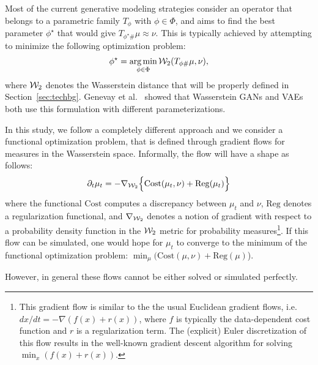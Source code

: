 Most of the current generative modeling strategies consider an operator that belongs to a parametric family $T_{\phi}$ with $\phi \in \Phi$, and aims to find the best parameter $\phi^\star$ that would give $T_{\phi^\star \#}\mu \approx \nu$. This is typically achieved by attempting to minimize the following optimization problem:
\begin{align}
\phi^\star = \operatorname*{arg\min}_{\phi \in \Phi} {\cal W}_2(T_{\phi \#}\mu, \nu),
\end{align}
where ${\cal W}_2$ denotes the Wasserstein distance that will be properly defined in Section~\ref{sec:techbg}. Genevay et al.\ \cite{genevay2017gan} showed that Wasserstein GANs and VAEs both use this formulation with different parameterizations.

In this study, we follow a completely different approach and we consider a functional optimization problem, that is defined through gradient flows for measures in the Wasserstein space. Informally, the flow will have a shape as follows:
\begin{align}
\partial_t \mu_t = - \nabla_{{\cal W}_2} \Bigl\{ \mathrm{Cost}(\mu_t, \nu) + \mathrm{Reg}(\mu_t)\Bigr\} \label{eqn:gradflow}
\end{align}
where the functional $\mathrm{Cost}$ computes a discrepancy between $\mu_t$ and $\nu$, $\mathrm{Reg}$ denotes a regularization functional, and $\nabla_{{\cal W}_2}$ denotes a notion of gradient with respect to a probability density function in the ${\cal W}_2$ metric for probability measures\footnote{This gradient flow is similar to the the usual Euclidean gradient flows, i.e.\ $dx/dt = - \nabla (f(x) + r(x))$, where $f$ is typically the data-dependent cost function and $r$ is a regularization term. The (explicit) Euler discretization of this flow results in the well-known gradient descent algorithm for solving $\min_x (f(x)+r(x))$.}. If this flow can be simulated, one would hope for $\mu_t$ to converge to the minimum of the functional optimization problem: $\min_\mu ( \mathrm{Cost}(\mu, \nu) + \mathrm{Reg}(\mu)$).

However, in general these flows cannot be either solved or simulated perfectly. 
